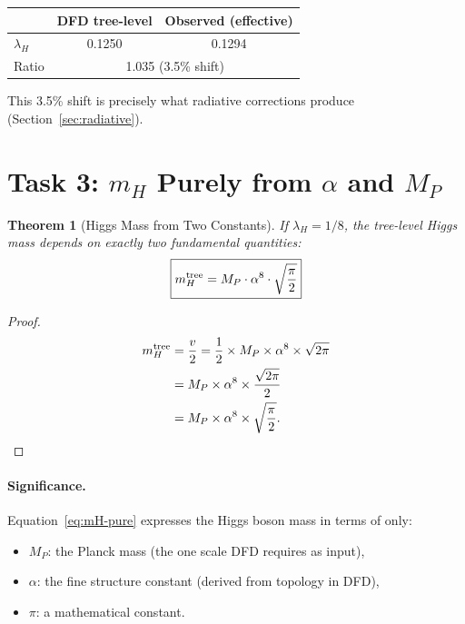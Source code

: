 \documentclass[11pt]{article}
\newtheorem{theorem}{Theorem}
\theoremstyle{definition}
\begin{document}
\begin{center}
\renewcommand{\arraystretch}{1.3}
\begin{tabular}{lcc}
\toprule
 & DFD tree-level & Observed (effective) \\
\midrule
$\lambda_H$ & 0.1250 & 0.1294 \\
Ratio & \multicolumn{2}{c}{1.035 (3.5\% shift)} \\
\bottomrule
\end{tabular}
\end{center}

This 3.5\% shift is precisely what radiative corrections produce
(Section~\ref{sec:radiative}).

\section{Task 3: $m_H$ Purely from $\alpha$ and $M_P$}
\label{sec:pure}

\begin{theorem}[Higgs Mass from Two Constants]\label{thm:mH-pure}
If $\lambda_H = 1/8$, the tree-level Higgs mass depends on exactly
two fundamental quantities:
\begin{equation}\label{eq:mH-pure}
\boxed{m_H^{\rm tree} = M_P \cdot \alpha^8 \cdot \sqrt{\frac{\pi}{2}}}
\end{equation}
\end{theorem}

\begin{proof}
\begin{align}
m_H^{\rm tree} &= \frac{v}{2}
= \frac{1}{2} \times M_P \times \alpha^8 \times \sqrt{2\pi} \notag \\
&= M_P \times \alpha^8 \times \frac{\sqrt{2\pi}}{2} \notag \\
&= M_P \times \alpha^8 \times \sqrt{\frac{\pi}{2}}.
\end{align}
\end{proof}

\paragraph{Significance.} Equation~\eqref{eq:mH-pure} expresses the
Higgs boson mass in terms of only:
\begin{itemize}
\item $M_P$: the Planck mass (the one scale DFD requires as input),
\item $\alpha$: the fine structure constant (derived from topology in DFD),
\item $\pi$: a mathematical constant.
\end{itemize}
\end{document}
